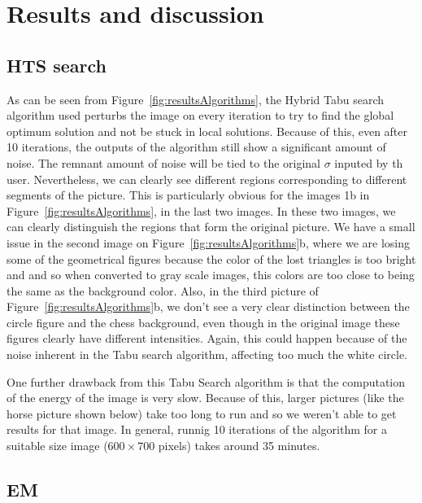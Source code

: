 \documentclass[twoside,10.5pt]{article}
\begin{document}
\section{Results and discussion}
\subsection{HTS search}
As can be seen from Figure~\ref{fig:resultsAlgorithms}, the Hybrid Tabu search algorithm used perturbs the image on every iteration to try to find the global optimum solution and not be stuck in local solutions. Because of this, even after 10 iterations, the outputs of the algorithm still show a significant amount of noise. The remnant amount of noise will be tied to the original $\sigma$ inputed by th user. Nevertheless, we can clearly see different regions corresponding to different segments of the picture. This is particularly obvious for the images 1b in Figure~\ref{fig:resultsAlgorithms}, in the last two images. In these two images, we can clearly distinguish the regions that form the original picture. We have a small issue in the second image on Figure~\ref{fig:resultsAlgorithms}b, where we are losing some of the geometrical figures because the color of the lost triangles is too bright and and so when converted to gray scale images, this colors are too close to being the same as the background color. Also, in the third picture of Figure~\ref{fig:resultsAlgorithms}b, we don't see a very clear distinction between the circle figure and the chess background, even though in the original image these figures clearly have different intensities. Again, this could happen because of the noise inherent in the Tabu search algorithm, affecting too much the white circle.

One further drawback from this Tabu Search algorithm is that the computation of the energy of the image is very slow. Because of this, larger pictures (like the horse picture shown below) take too long to run and so we weren't able to get results for that image. In general, runnig 10 iterations of the algorithm for a suitable size image ($600 \times 700$ pixels) takes around 35 minutes.

\subsection{EM}
\end{document}
